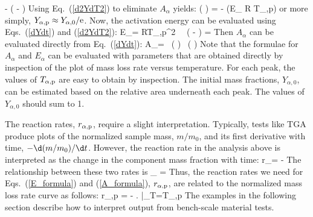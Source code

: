 \documentclass[11pt]{book}
\begin{document}
   \approx -  \; \exp \left( - \right)
\ee
Using Eq.~(\ref{d2YdT2}) to eliminate $A_\alpha$ yields:
\be
   \ln \left(  \right) = -    \quad \quad (E_\alpha {} R T_{\alpha,{\rm p}})
\ee
or more simply, $Y_{\alpha,{\rm p}} \approx Y_{\alpha,0}/{\rm e}$. Now, the activation energy can be evaluated using Eqs.~(\ref{dYdt}) and (\ref{d2YdT2}):
\be
   E_\alpha = RT_{\alpha,{\rm p}}^2 \,  \, \exp \left( - \right) =  
   \approx {}   \label{E_formula}
\ee
Then $A_\alpha$ can be evaluated directly from Eq.~(\ref{dYdt}):
\be
   A_\alpha =  \, \exp \left(  \right) \approx {} \, \exp \left(  \right) \label{A_formula}
\ee
Note that the formulae for $A_\alpha$ and $E_\alpha$ can be evaluated with parameters that are obtained directly by inspection of the plot of mass loss rate versus temperature. For each peak, the values of $T_{\alpha,{\rm p}}$ are easy to obtain by inspection. The initial mass fractions, $Y_{\alpha,0}$, can be estimated based on the relative area underneath each peak. The values of $Y_{\alpha,0}$ should sum to 1.

The reaction rates, $r_{\alpha,{\rm p}}$, require a slight interpretation. Typically, tests like TGA produce plots of the normalized sample mass, $m/m_0$, and its first derivative with time, $-\d (m/m_0) /\d t$. However, the reaction rate in the analysis above is interpreted as the change in the component mass fraction with time:
\be
   r_\alpha = - 
\ee
The relationship between these two rates is
\be
   \sum_\alpha {} =  
\ee
Thus, the reaction rates we need for Eqs.~(\ref{E_formula}) and (\ref{A_formula}), $r_{\alpha,{\rm p}}$, are related to the normalized mass loss rate curve as follows:
\be
   r_{\alpha,{\rm p}} = -  \left.  \right|_{T=T_{\alpha,{\rm p}}}
   \label{rr_calc}
\ee
The examples in the following section describe how to interpret output from bench-scale material tests.
\end{document}
